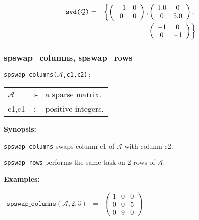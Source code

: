 \begin{eqnarray}
\hspace*{0.1in}
\texttt{svd($\mathcal{Q}$)} & = & 
\left\{ 
        \left( \begin{array}{cc} -1 & 0 \\ 0 & 0 \end{array} \right), 
\left( \begin{array}{cc} 1.0 & 0 \\ 0 & 5.0 \end{array} \right), 
\right. \nonumber \\ & & \left. \: \; 
\, \left( \begin{array}{cc} -1 & 0 \\ 0 & -1 \end{array} \right)       
\right\} \nonumber \end{eqnarray}

\subsubsection{spswap\_columns, spswap\_rows}

\hspace*{0.175in} \texttt{spswap\_columns($\mathcal{A}$,c1,c2);}

\hspace*{0.1in} 
\begin{tabular}{l l l}
$\mathcal{A}$ &:-& a sparse matrix. \\
c1,c1      &:-& positive integers. 
\end{tabular}

\textbf{Synopsis:} 

\hspace*{0.175in} 
\texttt{spswap\_columns} swaps column c1 of $\mathcal{A}$ with column c2. 

\hspace*{0.175in} \texttt{spswap\_rows} performs the same task on 2 rows of 
                $\mathcal{A}$.

\textbf{Examples:}

\begin{flushleft}  
\hspace*{0.1in}
\begin{math}  
\begin{array}{ccc}
\texttt{spswap\_columns}(\mathcal{A},2,3) & = & 
        \left( \begin{array}{ccc} 1 & 0 & 0 \\ 0 & 0 & 5 \\ 0 & 9 & 0
 \end{array} \right) 
\end{array}
\end{math}  
\end{flushleft}

